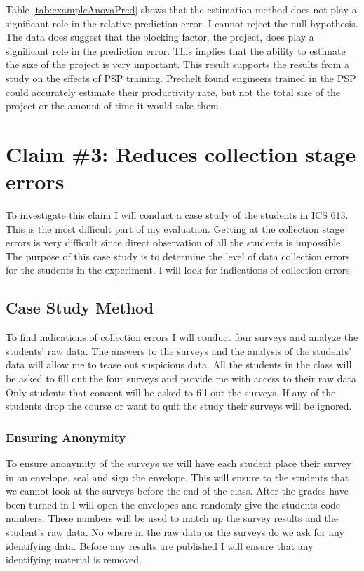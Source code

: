 Table \ref{tab:exampleAnovaPred} shows that the estimation method does not play
a significant role in the relative prediction error.  I cannot reject the null
hypothesis. The data does suggest that the blocking factor, the project, does
play a significant role in the prediction error.  This implies that the ability
to estimate the size of the project is very important. This result supports the
results from a study on the effects of PSP training\cite{Prechelt99}. Prechelt
found engineers trained in the PSP could accurately estimate their productivity
rate, but not the total size of the project or the amount of time it would take 
them.

\section{Claim \#3: Reduces collection stage errors}

To investigate this claim I will conduct a case study of the students in ICS
613. This is the most difficult part of my evaluation.  Getting at the
collection stage errors is very difficult since direct observation of all the
students is impossible.  The purpose of this case study is to determine the
level of data collection errors for the students in the experiment. I will look
for indications of collection errors.

\subsection{Case Study Method}

To find indications of collection errors I will conduct four surveys and
analyze the students' raw data.  The answers to the surveys and the analysis of
the students' data will allow me to tease out suspicious data.  All the students
in the class will be asked to fill out the four surveys and provide me with
access to their raw data.  Only students that consent will be asked to fill out
the surveys.  If any of the students drop the course or want to quit the study
their surveys will be ignored. 

\subsubsection{Ensuring Anonymity}

To ensure anonymity of the surveys we will have each student place their survey 
in an envelope, seal and sign the envelope.  This will ensure to the students
that we cannot look at the surveys before the end of the class. After the
grades have been turned in I will open the envelopes and randomly give the
students code numbers.  These numbers will be used to match up the survey
results and the student's raw data.  No where in the raw data or the surveys do 
we ask for any identifying data.  Before any results are published I will
ensure that any identifying material is removed.


